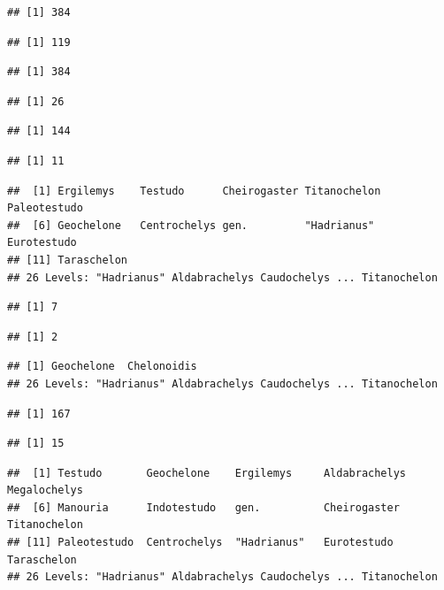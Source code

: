 \documentclass[]{article}
\begin{document}
\begin{verbatim}
## [1] 384
\end{verbatim}

\begin{verbatim}
## [1] 119
\end{verbatim}

\begin{verbatim}
## [1] 384
\end{verbatim}

\begin{verbatim}
## [1] 26
\end{verbatim}

\begin{verbatim}
## [1] 144
\end{verbatim}

\begin{verbatim}
## [1] 11
\end{verbatim}

\begin{verbatim}
##  [1] Ergilemys    Testudo      Cheirogaster Titanochelon Paleotestudo
##  [6] Geochelone   Centrochelys gen.         "Hadrianus"  Eurotestudo 
## [11] Taraschelon 
## 26 Levels: "Hadrianus" Aldabrachelys Caudochelys ... Titanochelon
\end{verbatim}

\begin{verbatim}
## [1] 7
\end{verbatim}

\begin{verbatim}
## [1] 2
\end{verbatim}

\begin{verbatim}
## [1] Geochelone  Chelonoidis
## 26 Levels: "Hadrianus" Aldabrachelys Caudochelys ... Titanochelon
\end{verbatim}

\begin{verbatim}
## [1] 167
\end{verbatim}

\begin{verbatim}
## [1] 15
\end{verbatim}

\begin{verbatim}
##  [1] Testudo       Geochelone    Ergilemys     Aldabrachelys Megalochelys 
##  [6] Manouria      Indotestudo   gen.          Cheirogaster  Titanochelon 
## [11] Paleotestudo  Centrochelys  "Hadrianus"   Eurotestudo   Taraschelon  
## 26 Levels: "Hadrianus" Aldabrachelys Caudochelys ... Titanochelon
\end{verbatim}
\end{document}
